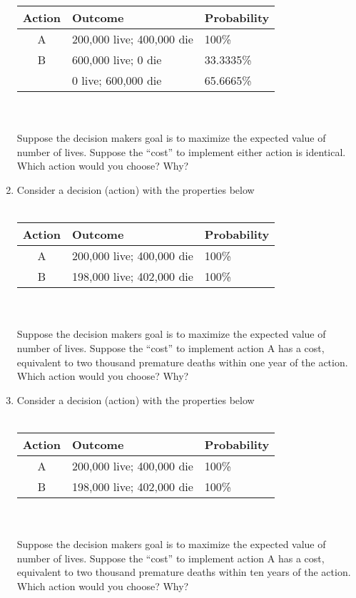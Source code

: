 \documentclass[12pt]{article}
\begin{document}
\begin{enumerate}
\begin{tabular}{cll}
Action & Outcome & Probability \\
\hline
\hline
A & 200,000 live; 400,000 die & 100\% \\
B & 600,000 live; 0 die & 33.3335\% \\
~ & 0 live; 600,000 die & 65.6665\% \\
\end{tabular}\\~\\
Suppose the decision makers goal is to maximize the expected value of number of lives.
Suppose the ``cost'' to implement either action is identical.
Which action would you choose? Why?
\newpage
\item Consider a decision (action) with the properties below \\ ~\\
\begin{tabular}{cll}
Action & Outcome & Probability \\
\hline
\hline
A & 200,000 live; 400,000 die & 100\% \\
B & 198,000 live; 402,000 die & 100\% \\
\end{tabular}\\~\\
Suppose the decision makers goal is to maximize the expected value of number of lives.
Suppose the ``cost'' to implement action A has a cost, equivalent to two thousand premature deaths within one year of the action.
Which action would you choose? Why?
\item Consider a decision (action) with the properties below \\ ~\\
\begin{tabular}{cll}
Action & Outcome & Probability \\
\hline
\hline
A & 200,000 live; 400,000 die & 100\% \\
B & 198,000 live; 402,000 die & 100\% \\
\end{tabular}\\~\\
Suppose the decision makers goal is to maximize the expected value of number of lives.
Suppose the ``cost'' to implement action A has a cost, equivalent to two thousand premature deaths within ten years of the action.
Which action would you choose? Why?

\end{enumerate}
\end{document}
